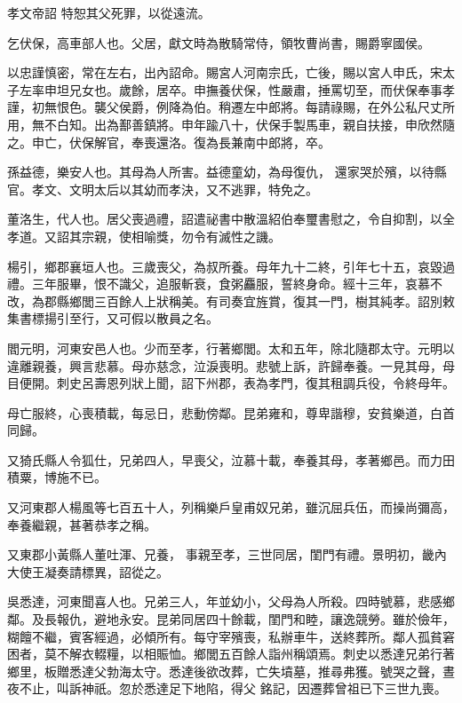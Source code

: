 \begin{pinyinscope}
 孝文帝詔
 特恕其父死罪，以從遠流。



 乞伏保，高車部人也。父居，獻文時為散騎常侍，領牧曹尚書，賜爵寧國侯。



 以忠謹慎密，常在左右，出內詔命。賜宮人河南宗氏，亡後，賜以宮人申氏，宋太子左率申坦兄女也。歲餘，居卒。申撫養伏保，性嚴肅，捶罵切至，而伏保奉事孝謹，初無恨色。襲父侯爵，例降為伯。稍遷左中郎將。每請祿賜，在外公私尺丈所用，無不白知。出為鄯善鎮將。申年踰八十，伏保手製馬車，親自扶接，申欣然隨之。申亡，伏保解官，奉喪還洛。復為長兼南中郎將，卒。



 孫益德，樂安人也。其母為人所害。益德童幼，為母復仇，
 還家哭於殯，以待縣官。孝文、文明太后以其幼而孝決，又不逃罪，特免之。



 董洛生，代人也。居父喪過禮，詔遣祕書中散溫紹伯奉璽書慰之，令自抑割，以全孝道。又詔其宗親，使相喻獎，勿令有滅性之譏。



 楊引，鄉郡襄垣人也。三歲喪父，為叔所養。母年九十二終，引年七十五，哀毀過禮。三年服畢，恨不識父，追服斬衰，食粥麤服，誓終身命。經十三年，哀慕不改，為郡縣鄉閭三百餘人上狀稱美。有司奏宜旌賞，復其一門，樹其純孝。詔別敕集書標揚引至行，又可假以散員之名。



 閻元明，河東安邑人也。少而至孝，行著鄉閭。太和五年，除北隨郡太守。元明以違離親養，興言悲慕。母亦慈念，泣淚喪明。悲號上訴，許歸奉養。一見其母，母目便開。刺史呂壽恩列狀上聞，詔下州郡，表為孝門，復其租調兵役，令終母年。



 母亡服終，心喪積載，每忌日，悲動傍鄰。昆弟雍和，尊卑諧穆，安貧樂道，白首同歸。



 又猗氏縣人令狐仕，兄弟四人，早喪父，泣慕十載，奉養其母，孝著鄉邑。而力田積粟，博施不已。



 又河東郡人楊風等七百五十人，列稱樂戶皇甫奴兄弟，雖沉屈兵伍，而操尚彌高，奉養繼親，甚著恭孝之稱。



 又東郡小黃縣人董吐渾、兄養，
 事親至孝，三世同居，閨門有禮。景明初，畿內大使王凝奏請標異，詔從之。



 吳悉達，河東聞喜人也。兄弟三人，年並幼小，父母為人所殺。四時號慕，悲感鄉鄰。及長報仇，避地永安。昆弟同居四十餘載，閨門和睦，讓逸競勞。雖於儉年，糊饘不繼，賓客經過，必傾所有。每守宰殯喪，私辦車牛，送終葬所。鄰人孤貧窘困者，莫不解衣輟糧，以相賑恤。鄉閭五百餘人詣州稱頌焉。刺史以悉達兄弟行著鄉里，板贈悉達父勃海太守。悉達後欲改葬，亡失墳墓，推尋弗獲。號哭之聲，晝夜不止，叫訴神祇。忽於悉達足下地陷，得父
 銘記，因遷葬曾祖已下三世九喪。




\end{pinyinscope}
